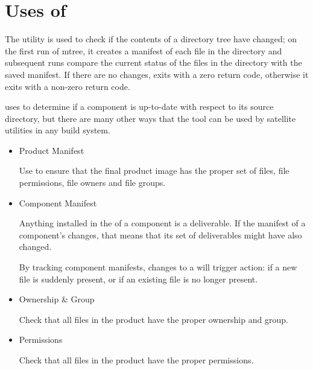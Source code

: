 %
%
%
%
\chapter{Uses of \mtree}\label{chap:mtree}

The \mtree utility is used to check if the contents of a directory
tree have changed; on the first run of mtree, it creates a manifest of
each file in the directory and subsequent runs compare the current
status of the files in the directory with the saved manifest.  If
there are no changes, \mtree exits with a zero return code, otherwise
it exits with a non-zero return code.

\lmsbw uses \mtree to determine if a component is up-to-date with
respect to its source directory, but there are many other ways that
the tool can be used by satellite utilities in any build system.

\begin{itemize}
\item Product Manifest

  Use \mtree to ensure that the final product image has the proper set
  of files, file permissions, file owners and file groups.

\item Component Manifest

  Anything installed in the \destdir of a component is a deliverable.
  If the manifest of a component's \destdir changes, that means that
  its set of deliverables might have also changed.

  By tracking component \destdir manifests, changes to a \destdir will
  trigger action: if a new file is suddenly present, or if an existing
  file is no longer present.

\item Ownership \& Group

  Check that all files in the product have the proper ownership and
  group.

\item Permissions

  Check that all files in the product have the proper permissions.

\end{itemize}
